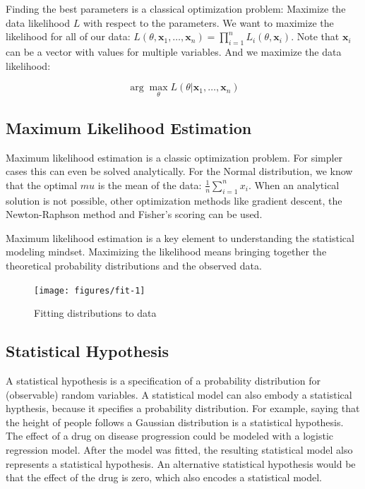 \documentclass[
  10pt,
]{scrbook}
\begin{document}
Finding the best parameters is a classical optimization problem:
Maximize the data likelihood \(L\) with respect to the parameters.
We want to maximize the likelihood for all of our data: \(L(\theta, \mathbf{x}_1, \ldots, \mathbf{x}_n) = \prod_{i=1}^n L_i(\theta, \mathbf{x}_i)\).
Note that \(\mathbf{x}_i\) can be a vector with values for multiple variables.
And we maximize the data likelihood:

\[\arg \max_{\theta} L(\theta | \mathbf{x}_1, \ldots, \mathbf{x}_n)\]

\hypertarget{maximum-likelihood-estimation}{%
\subsection*{Maximum Likelihood Estimation}\label{maximum-likelihood-estimation}}


Maximum likelihood estimation is a classic optimization problem.
For simpler cases this can even be solved analytically.
For the Normal distribution, we know that the optimal \(mu\) is the mean of the data: \(\frac{1}{n} \sum_{i=1}^n x_i\).
When an analytical solution is not possible, other optimization methods like gradient descent, the Newton-Raphson method and Fisher's scoring can be used.

Maximum likelihood estimation is a key element to understanding the statistical modeling mindset.
Maximizing the likelihood means bringing together the theoretical probability distributions and the observed data.

\begin{figure}

{\centering \texttt{[image: figures/fit-1]} 

}

\caption{Fitting distributions to data}\label{fig:fit}
\end{figure}

\hypertarget{statistical-hypothesis}{%
\subsection*{Statistical Hypothesis}\label{statistical-hypothesis}}


A statistical hypothesis is a specification of a probability distribution for (observable) random variables.
A statistical model can also embody a statistical hypthesis, because it specifies a probability distribution.
For example, saying that the height of people follows a Gaussian distribution is a statistical hypothesis.
The effect of a drug on disease progression could be modeled with a logistic regression model.
After the model was fitted, the resulting statistical model also represents a statistical hypothesis.
An alternative statistical hypothesis would be that the effect of the drug is zero, which also encodes a statistical model.
\end{document}
